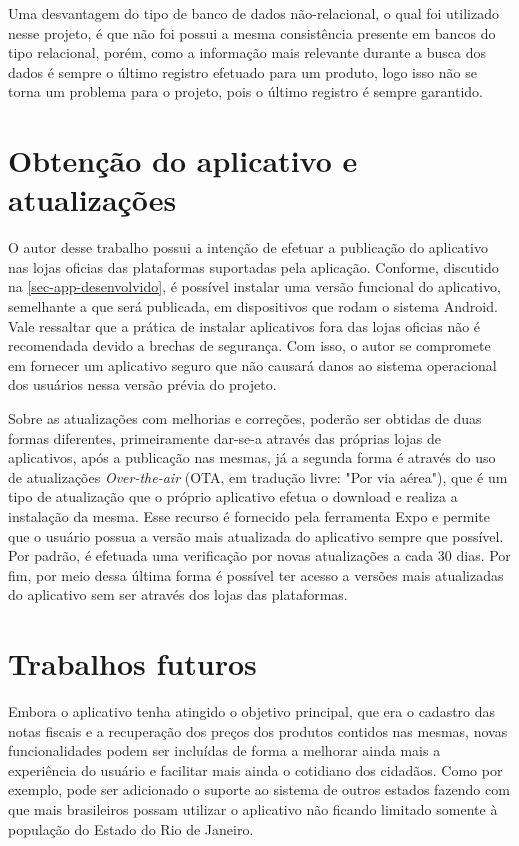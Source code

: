 Uma desvantagem do tipo de banco de dados não-relacional, o qual foi utilizado nesse projeto, é que não foi possui a mesma consistência presente em bancos do tipo relacional, porém, como a informação mais relevante durante a busca dos dados é sempre o último registro efetuado para um produto, logo isso não se torna um problema para o projeto, pois o último registro é sempre garantido.

\section{Obtenção do aplicativo e atualizações}

O autor desse trabalho possui a intenção de efetuar a publicação do aplicativo nas lojas oficias das plataformas suportadas pela aplicação. Conforme, discutido na \autoref{sec-app-desenvolvido}, é possível instalar uma versão funcional do aplicativo, semelhante a que será publicada, em dispositivos que rodam o sistema Android. Vale ressaltar que a prática de instalar aplicativos fora das lojas oficias não é recomendada devido a brechas de segurança. Com isso, o autor se compromete em fornecer um aplicativo seguro que não causará danos ao sistema operacional dos usuários nessa versão prévia do projeto.

Sobre as atualizações com melhorias e correções, poderão ser obtidas de duas formas diferentes, primeiramente dar-se-a através das próprias lojas de aplicativos, após a publicação nas mesmas, já a segunda forma é através do uso de atualizações \textit{Over-the-air} (OTA, em tradução livre: "Por via aérea"), que é um tipo de atualização que o próprio aplicativo efetua o download e realiza a instalação da mesma. Esse recurso é fornecido pela ferramenta Expo e permite que o usuário possua a versão mais atualizada do aplicativo sempre que possível. Por padrão, é efetuada uma verificação por novas atualizações a cada 30 dias. Por fim, por meio dessa última forma é possível ter acesso a versões mais atualizadas do aplicativo sem ser através dos lojas das plataformas.

\section{Trabalhos futuros}

Embora o aplicativo tenha atingido o objetivo principal, que era o cadastro das notas fiscais e a recuperação dos preços dos produtos contidos nas mesmas, novas funcionalidades podem ser incluídas de forma a melhorar ainda mais a experiência do usuário e facilitar mais ainda o cotidiano dos cidadãos. Como por exemplo, pode ser adicionado o suporte ao sistema de outros estados fazendo com que mais brasileiros possam utilizar o aplicativo não ficando limitado somente à população do Estado do Rio de Janeiro.

